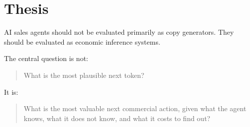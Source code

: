 \documentclass[12pt]{article}
\begin{document}
\section{Thesis}

AI sales agents should not be evaluated primarily as copy generators. They should
be evaluated as economic inference systems.

The central question is not:

\begin{quote}
    What is the most plausible next token?
\end{quote}

It is:

\begin{quote}
    What is the most valuable next commercial action, given what the agent knows,
    what it does not know, and what it costs to find out?
\end{quote}
\end{document}
